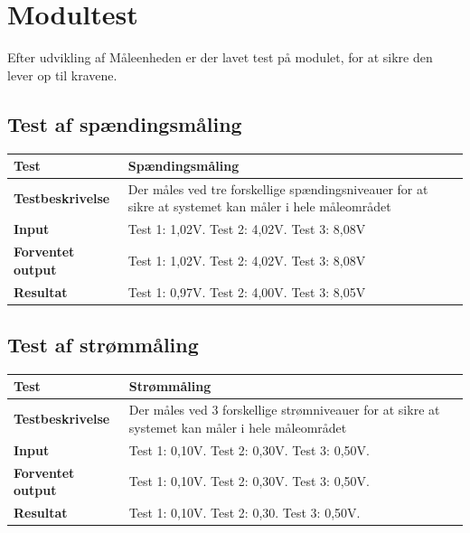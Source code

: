 
\section{Modultest}

Efter udvikling af Måleenheden er der lavet test på modulet, for at sikre den lever op til  kravene.

\subsection*{Test af spændingsmåling}
\begin{center}
	\begin{tabular}{ | m{} | m{}|} 
		\hline
		\textbf{Test}					&Spændingsmåling \\ \hline
		\textbf{Testbeskrivelse}		&Der måles ved tre forskellige spændingsniveauer for at sikre at systemet kan måler i hele måleområdet  \\ \hline
		\textbf{Input}					&Test 1: 1,02V. Test 2: 4,02V. Test 3: 8,08V\\ \hline
		\textbf{Forventet output}		&Test 1: 1,02V. Test 2: 4,02V. Test 3: 8,08V\\ \hline
		\textbf{Resultat}				&Test 1: 0,97V. Test 2: 4,00V. Test 3: 8,05V\\ \hline
	\end{tabular}
\end{center}


\subsection*{Test af strømmåling}
\begin{center}
	\begin{tabular}{ | m{} | m{}|} 
		\hline
		\textbf{Test}					&Strømmåling \\ \hline
		\textbf{Testbeskrivelse}		&Der måles ved 3 forskellige strømniveauer for at sikre at systemet kan måler i hele måleområdet  \\ \hline
		\textbf{Input}							&Test 1: 0,10V. Test 2: 0,30V. Test 3: 0,50V.\\ \hline
		\textbf{Forventet output}		&Test 1: 0,10V. Test 2: 0,30V. Test 3: 0,50V. \\ \hline
		\textbf{Resultat}					&Test 1: 0,10V. Test 2: 0,30. Test 3: 0,50V.\\ \hline
	\end{tabular}
\end{center}


